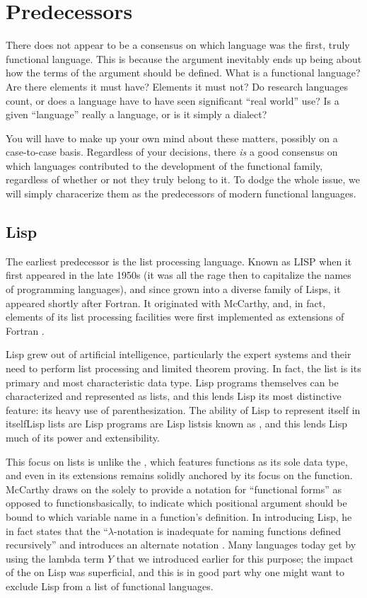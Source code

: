 \section{Predecessors}
There does not appear to be a consensus on which language was the first, truly functional language. This is because the argument inevitably ends up being about how the terms of the argument should be defined. What is a functional language? Are there elements it must have? Elements it must not? Do research languages count, or does a language have to have seen significant ``real world'' use? Is a given ``language'' really a language, or is it simply a dialect?

You will have to make up your own mind about these matters, possibly on a case-to-case basis. Regardless of your decisions, there \emph{is} a good consensus on which languages contributed to the development of the functional family, regardless of whether or not they truly belong to it. To dodge the whole issue, we will simply characerize them as the predecessors of modern functional languages.

\subsection{Lisp}
The earliest predecessor is the list processing language. Known as LISP when it first appeared in the late 1950s (it was all the rage then to capitalize the names of programming languages), and since grown into a diverse family of Lisps, it appeared shortly after Fortran. It originated with McCarthy, and, in fact, elements of its list processing facilities were first implemented as extensions of Fortran \citep{Stoyan:Early:1984}.

Lisp grew out of artificial intelligence, particularly the expert systems and their need to perform list processing and limited theorem proving. In fact, the list is its primary and most characteristic data type. Lisp programs themselves can be characterized and represented as lists, and this lends Lisp its most distinctive feature: its heavy use of parenthesization. The ability of Lisp to represent itself in itself\empause Lisp lists are Lisp programs are Lisp lists\empause is known as , and this lends Lisp much of its power and extensibility.

This focus on lists is unlike the \lambdacalc{}, which features functions as its sole data type, and even in its extensions remains solidly anchored by its focus on the function. McCarthy draws on the \lambdacalc solely to provide a notation for ``functional forms'' as opposed to functions\empause basically, to indicate which positional argument should be bound to which variable name in a function's definition. In introducing Lisp, he in fact states that the ``$\lambda$-notation is inadequate for naming functions defined recursively'' and introduces an alternate notation \citep{McCarthy:Recursive:1960}. Many languages today get by using the lambda term $Y$ that we introduced earlier for this purpose; the impact of the \lambdacalc on Lisp was superficial, and this is in good part why one might want to exclude Lisp from a list of functional languages.

